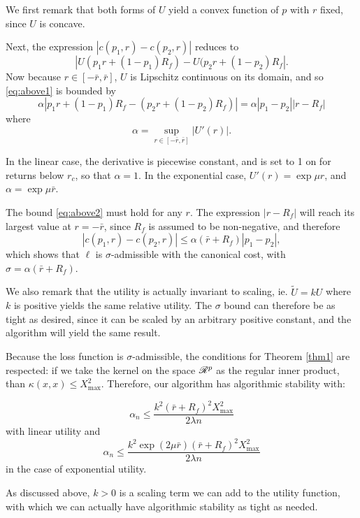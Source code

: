 \begin{rem}
  We first remark that both forms of $U$ yield a convex function of $p$ with $r$ fixed,
  since $U$ is concave. 

  Next, the expression $|c(p_1,r)-c(p_2,r)|$ reduces to
  \begin{equation}
    \label{eq:above1} |U(p_1r + (1-p_1)R_f) - U(p_2r + (1-p_2)R_f|.
  \end{equation} Now because $r\in[-\bar r,\bar r]$, $U$ is Lipschitz continuous on its
domain, and so \eqref{eq:above1} is bounded by
  \begin{equation}
    \label{eq:above2} \alpha |p_1r + (1-p_1)R_f - (p_2r + (1-p_2)R_f)| =
\alpha|p_1-p_2||r-R_f|
  \end{equation} where
  \begin{equation} \alpha = \sup_{r\in[-\bar r,\bar r]} |U'(r)|.
  \end{equation}

  In the linear case, the derivative is piecewise constant, and is set to 1 on for returns
below $r_c$, so that $\alpha=1$. In the exponential case, $U'(r) = \exp\mu r$, and $\alpha
= \exp \mu \bar r$.

  The bound \eqref{eq:above2} must hold for any $r$. The expression $|r-R_f|$ will reach
  its largest value at $r=-\bar r$, since $R_f$ is assumed to be non-negative, and
  therefore 
  \begin{equation}
    |c(p_1,r) - c(p_2,r)| \leq \alpha (\bar r + R_f)|p_1-p_2|,
  \end{equation}
  which shows that $\ell$ is $\sigma$-admissible with the canonical cost, with
  $\sigma=\alpha(\bar r+ R_f)$.

  We also remark that the utility is actually invariant to scaling, ie. $\tilde{U} = kU$
  where $k$ is positive yields the same relative utility. The $\sigma$ bound can therefore
  be as tight as desired, since it can be scaled by an arbitrary positive constant, and
  the algorithm will yield the same result.
\end{rem}

\begin{rem}
  Because the loss function is $\sigma$-admissible, the conditions for Theorem \ref{thm1}
  are respected: if we take the kernel on the space $\mathscr{R}^p$ as the regular inner
  product, than $\kappa(x,x)\leq X^2_{\max}$. Therefore, our algorithm has algorithmic
  stability with:

  \begin{equation}
    \alpha_n \leq \frac{k^2(\bar r+R_f)^2X^2_{\max}}{2\lambda n}
  \end{equation}
  with linear utility and
  \begin{equation}
    \alpha_n \leq \frac{k^2 \exp(2\mu\bar r)(\bar r + R_f)^2 X^2_{\max}}{2\lambda n}
  \end{equation}
  in the case of exponential utility.

  As discussed above, $k>0$ is a scaling term we can add to the utility function, with
  which we can actually have algorithmic stability as tight as needed. 
\end{rem}

